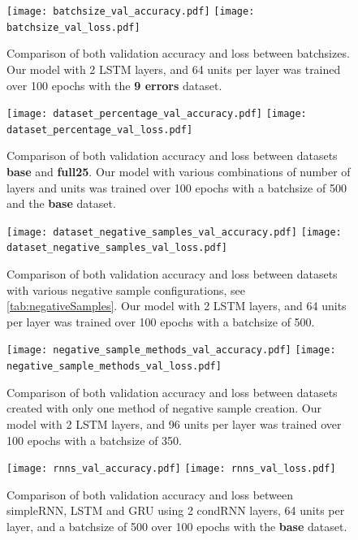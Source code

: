 \documentclass[
	ngerman,
	ruledheaders=section,%
	class=report,%
	thesis={type=bachelor},%
	accentcolor=9c,%
	custommargins=true,%
	marginpar=false,%
	parskip=half-,%
	fontsize=11pt,%
	twoside
]{tudapub}
\begin{document}
\begin{figure}
    \texttt{[image: batchsize\_val\_accuracy.pdf]}
    \texttt{[image: batchsize\_val\_loss.pdf]}
    \caption{Comparison of both validation accuracy and loss between batchsizes.
    Our model with 2 LSTM layers, and 64 units per layer was trained over 100 epochs with the \textbf{9 errors} dataset.}
    \label{fig:batchsize}
\end{figure}

\begin{figure}
    \texttt{[image: dataset\_percentage\_val\_accuracy.pdf]}
    \texttt{[image: dataset\_percentage\_val\_loss.pdf]}
    \caption{Comparison of both validation accuracy and loss between datasets \textbf{base} and \textbf{full25}.
    Our model with various combinations of number of layers and units was trained over 100 epochs with a batchsize of 500 and the \textbf{base} dataset.}
    \label{fig:dataset_percentage}
\end{figure}

\begin{figure}
    \texttt{[image: dataset\_negative\_samples\_val\_accuracy.pdf]}
    \texttt{[image: dataset\_negative\_samples\_val\_loss.pdf]}
    \caption{Comparison of both validation accuracy and loss between datasets with various negative sample configurations, see \ref{tab:negativeSamples}.
    Our model with 2 LSTM layers, and 64 units per layer was trained over 100 epochs with a batchsize of 500.}
    \label{fig:dataset_negative}
\end{figure}

\begin{figure}
    \texttt{[image: negative\_sample\_methods\_val\_accuracy.pdf]}
    \texttt{[image: negative\_sample\_methods\_val\_loss.pdf]}
    \caption{Comparison of both validation accuracy and loss between datasets created with only one method of negative sample creation.
    Our model with 2 LSTM layers, and 96 units per layer was trained over 100 epochs with a batchsize of 350.}
    \label{fig:negative_methods}
\end{figure}

\begin{figure}
    \texttt{[image: rnns\_val\_accuracy.pdf]}
    \texttt{[image: rnns\_val\_loss.pdf]}
    \caption{Comparison of both validation accuracy and loss between simpleRNN, LSTM and GRU using 2 condRNN layers, 64 units per layer, and a batchsize of 500 over 100 epochs with the \textbf{base} dataset.}
    \label{fig:rnns}
\end{figure}
\end{document}
